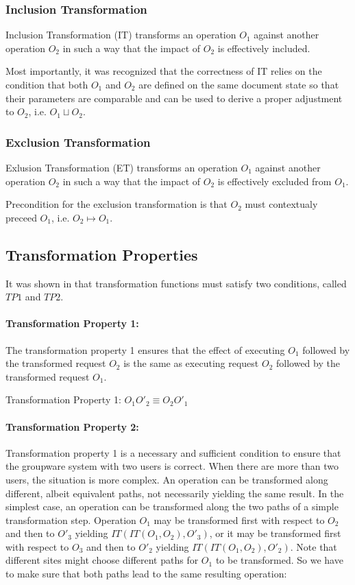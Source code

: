 \documentclass[11pt,a4paper]{article}
\begin{document}
\subsubsection{Inclusion Transformation}
Inclusion Transformation (IT) transforms an operation $O_{1}$ against another operation $O_{2}$ in such a way that the impact of $O_{2}$ is effectively included. 

Most importantly, it was recognized that the correctness of IT relies on the condition that both $O_{1}$ and $O_{2}$ are defined on the same document state so that their parameters are comparable and can be used to derive a proper adjustment to $O_{2}$, i.e. $O_{1} \sqcup O_{2}$.

\subsubsection{Exclusion Transformation}
Exlusion Transformation (ET) transforms an operation $O_{1}$ against another operation $O_{2}$ in such a way that the impact of $O_{2}$ is effectively excluded from $O_{1}$.

Precondition for the exclusion transformation is that $O_{2}$ must contextualy preceed $O_{1}$, i.e. $O_{2} \mapsto O_{1}$.


\subsection{Transformation Properties}
It was shown in \cite{ressel:adopted} that transformation functions must satisfy two conditions, called $TP1$ and $TP2$.

\paragraph{Transformation Property 1:}
The transformation property 1 ensures that the effect of executing $O_{1}$ followed by the transformed request $O_{2}$ is the same as executing request $O_{2}$ followed by the transformed request $O_{1}$. 

\begin{defn}
Transformation Property 1:
$ O_{1} O'_{2} \equiv O_{2} O'_{1} $
\end{defn}

\paragraph{Transformation Property 2:}
Transformation property 1 is a necessary and sufficient condition to ensure that the groupware system with two users is correct. When there are more than two users, the situation is more complex. An operation can be transformed along different, albeit equivalent paths, not necessarily yielding the same result. In the simplest case, an operation can be transformed along the two paths of a simple transformation step. Operation $O_{1}$ may be transformed first with respect to $O_{2}$ and then to $O'_{3}$ yielding $IT(IT(O_{1},O_{2}),O'_{3})$, or it may be transformed first with respect to $O_{3}$ and then to $O'_{2}$ yielding $IT(IT(O_{1},O_{2}),O'_{2})$. Note that different sites might choose different paths for $O_{1}$ to be transformed. So we have to make sure that both paths lead to the same resulting operation:
\end{document}
